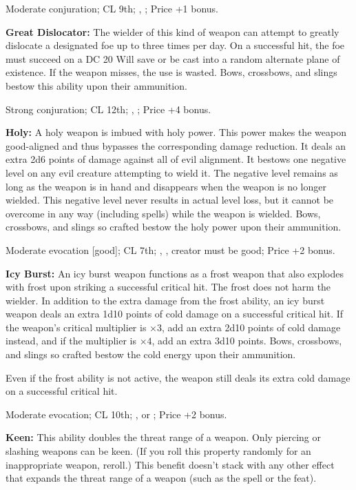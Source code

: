 Moderate conjuration; CL 9th; , ; Price +1 bonus.


\textbf{Great Dislocator:} The wielder of this kind of weapon can attempt to greatly dislocate a designated foe up to three times per day. On a successful hit, the foe must succeed on a DC 20 Will save or be cast into a random alternate plane of existence. If the weapon misses, the use is wasted. Bows, crossbows, and slings bestow this ability upon their ammunition.

Strong conjuration; CL 12th; , ; Price +4 bonus.


\textbf{Holy:} A holy weapon is imbued with holy power. This power makes the weapon good-aligned and thus bypasses the corresponding damage reduction. It deals an extra 2d6 points of damage against all of evil alignment. It bestows one negative level on any evil creature attempting to wield it. The negative level remains as long as the weapon is in hand and disappears when the weapon is no longer wielded. This negative level never results in actual level loss, but it cannot be overcome in any way (including  spells) while the weapon is wielded. Bows, crossbows, and slings so crafted bestow the holy power upon their ammunition.

Moderate evocation [good]; CL 7th; , , creator must be good; Price +2 bonus.


\textbf{Icy Burst:} An icy burst weapon functions as a frost weapon that also explodes with frost upon striking a successful critical hit. The frost does not harm the wielder. In addition to the extra damage from the frost ability, an icy burst weapon deals an extra 1d10 points of cold damage on a successful critical hit. If the weapon's critical multiplier is $\times3$, add an extra 2d10 points of cold damage instead, and if the multiplier is $\times4$, add an extra 3d10 points. Bows, crossbows, and slings so crafted bestow the cold energy upon their ammunition.

Even if the frost ability is not active, the weapon still deals its extra cold damage on a successful critical hit.

Moderate evocation; CL 10th; ,  or ; Price +2 bonus.


\textbf{Keen:} This ability doubles the threat range of a weapon. Only piercing or slashing weapons can be keen. (If you roll this property randomly for an inappropriate weapon, reroll.) This benefit doesn't stack with any other effect that expands the threat range of a weapon (such as the  spell or the  feat).

